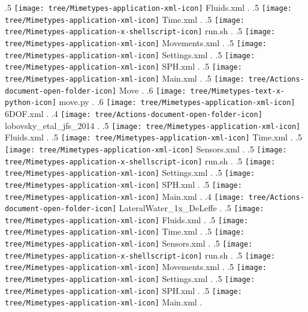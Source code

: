{.5 { \texttt{[image: tree/Mimetypes-application-xml-icon]} Fluids.xml }.
.5 { \texttt{[image: tree/Mimetypes-application-xml-icon]} Time.xml }.
.5 { \texttt{[image: tree/Mimetypes-application-x-shellscript-icon]} run.sh }.
.5 { \texttt{[image: tree/Mimetypes-application-xml-icon]} Movements.xml }.
.5 { \texttt{[image: tree/Mimetypes-application-xml-icon]} Settings.xml }.
.5 { \texttt{[image: tree/Mimetypes-application-xml-icon]} SPH.xml }.
.5 { \texttt{[image: tree/Mimetypes-application-xml-icon]} Main.xml }.
.5 { \texttt{[image: tree/Actions-document-open-folder-icon]} Move }.
.6 { \texttt{[image: tree/Mimetypes-text-x-python-icon]} move.py }.
.6 { \texttt{[image: tree/Mimetypes-application-xml-icon]} 6DOF.xml }.
.4 { \texttt{[image: tree/Actions-document-open-folder-icon]} lobovsky\_etal\_jfs\_2014 }.
.5 { \texttt{[image: tree/Mimetypes-application-xml-icon]} Fluids.xml }.
.5 { \texttt{[image: tree/Mimetypes-application-xml-icon]} Time.xml }.
.5 { \texttt{[image: tree/Mimetypes-application-xml-icon]} Sensors.xml }.
.5 { \texttt{[image: tree/Mimetypes-application-x-shellscript-icon]} run.sh }.
.5 { \texttt{[image: tree/Mimetypes-application-xml-icon]} Settings.xml }.
.5 { \texttt{[image: tree/Mimetypes-application-xml-icon]} SPH.xml }.
.5 { \texttt{[image: tree/Mimetypes-application-xml-icon]} Main.xml }.
.4 { \texttt{[image: tree/Actions-document-open-folder-icon]} LateralWater\_1x\_DeLeffe }.
.5 { \texttt{[image: tree/Mimetypes-application-xml-icon]} Fluids.xml }.
.5 { \texttt{[image: tree/Mimetypes-application-xml-icon]} Time.xml }.
.5 { \texttt{[image: tree/Mimetypes-application-xml-icon]} Sensors.xml }.
.5 { \texttt{[image: tree/Mimetypes-application-x-shellscript-icon]} run.sh }.
.5 { \texttt{[image: tree/Mimetypes-application-xml-icon]} Movements.xml }.
.5 { \texttt{[image: tree/Mimetypes-application-xml-icon]} Settings.xml }.
.5 { \texttt{[image: tree/Mimetypes-application-xml-icon]} SPH.xml }.
.5 { \texttt{[image: tree/Mimetypes-application-xml-icon]} Main.xml }.
}
